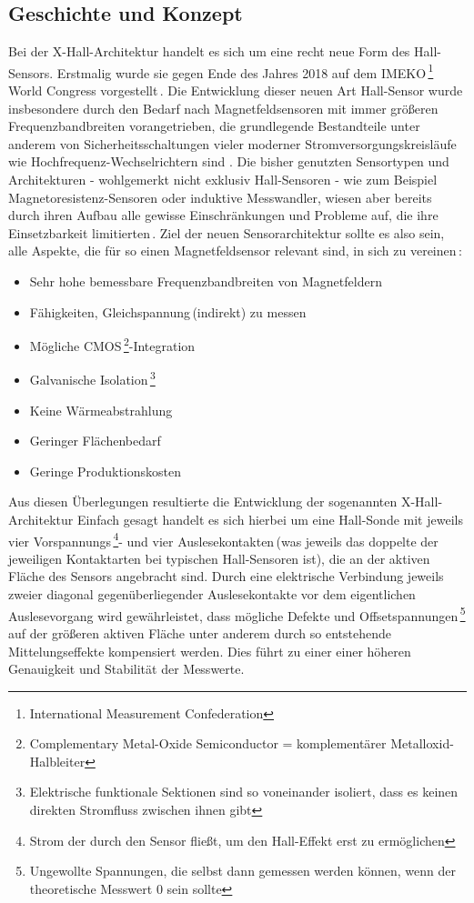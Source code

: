 \documentclass[12pt, a4paper]{article}
\begin{document}
\subsection{Geschichte und Konzept}
Bei der X-Hall-Architektur handelt es sich um eine recht neue Form des Hall-Sensors. Erstmalig wurde sie gegen Ende des Jahres 2018 auf dem IMEKO\,\footnote{International Measurement Confederation} 
World Congress vorgestellt\,\cite{cres19}. \newline
Die Entwicklung dieser neuen Art Hall-Sensor wurde insbesondere durch den Bedarf nach Magnetfeldsensoren mit immer größeren Frequenzbandbreiten vorangetrieben, die grundlegende Bestandteile unter anderem von Sicherheitsschaltungen vieler moderner Stromversorgungskreisläufe wie Hochfrequenz-Wechselrichtern sind\,\cite{cres18}\,\cite{cres21}. Die bisher genutzten Sensortypen und Architekturen - wohlgemerkt nicht exklusiv Hall-Sensoren - wie zum Beispiel Magnetoresistenz-Sensoren oder induktive Messwandler, wiesen aber bereits durch ihren Aufbau alle gewisse Einschränkungen und Probleme auf, die ihre Einsetzbarkeit limitierten\,\cite{cres21}. \newline
Ziel der neuen Sensorarchitektur sollte es also sein, alle Aspekte, die für so einen Magnetfeldsensor relevant sind, in sich zu vereinen\,\cite{cres19}: 
\begin{itemize}
	\item Sehr hohe bemessbare Frequenzbandbreiten von Magnetfeldern %
	\item Fähigkeiten, Gleichspannung\,(indirekt) zu messen
	\item Mögliche CMOS\,\footnote{Complementary Metal-Oxide Semiconductor = komplementärer Metalloxid-Halbleiter}-Integration
	\item Galvanische Isolation\,\footnote{Elektrische funktionale Sektionen sind so voneinander isoliert, dass es keinen direkten Stromfluss zwischen ihnen gibt}
	\item Keine Wärmeabstrahlung
	\item Geringer Flächenbedarf %
	\item Geringe Produktionskosten
\end{itemize} 
Aus diesen Überlegungen resultierte die Entwicklung der sogenannten X-Hall-Architektur\newline
Einfach gesagt handelt es sich hierbei um eine Hall-Sonde mit jeweils vier Vorspannungs\,\footnote{Strom der durch den Sensor fließt, um den Hall-Effekt erst zu ermöglichen}- und vier Auslesekontakten\,(was jeweils das doppelte der jeweiligen Kontaktarten bei typischen Hall-Sensoren ist), die an der aktiven Fläche des Sensors angebracht sind. Durch eine elektrische Verbindung jeweils zweier diagonal gegenüberliegender Auslesekontakte vor dem eigentlichen Auslesevorgang wird gewährleistet, dass mögliche Defekte und Offsetspannungen\,\footnote{Ungewollte Spannungen, die selbst dann gemessen werden können, wenn der theoretische Messwert 0 sein sollte} auf der größeren aktiven Fläche unter anderem durch so entstehende Mittelungseffekte kompensiert werden. Dies führt zu einer einer höheren Genauigkeit und Stabilität der Messwerte.
\end{document}
